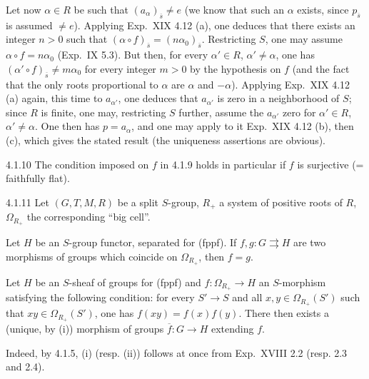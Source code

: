Let now $\alpha\in R$ be such that $(a_\alpha)_{\overline s}\ne e$ (we know that such an $\alpha$ exists, since $p_{\overline s}$ is assumed $\ne e$). Applying Exp.~XIX 4.12 (a), one deduces that there exists an integer $n>0$ such that $(\alpha\circ f)_{\overline s}=(n\alpha_0)_{\overline s}$. Restricting $S$, one may assume $\alpha\circ f=n\alpha_0$ (Exp.~IX 5.3). But then, for every $\alpha'\in R$, $\alpha'\ne\alpha$, one has $(\alpha'\circ f)_{\overline s}\ne m\alpha_0$ for every integer $m>0$ by the hypothesis on $f$ (and the fact that the only roots proportional to $\alpha$ are $\alpha$ and $-\alpha$). Applying Exp.~XIX 4.12 (a) again, this time to $a_{\alpha'}$, one deduces that $a_{\alpha'}$ is zero in a neighborhood of $S$; since $R$ is finite, one may, restricting $S$ further, assume the $a_{\alpha'}$ zero for $\alpha'\in R$, $\alpha'\ne\alpha$. One then has $p=a_\alpha$, and one may apply to it Exp.~XIX 4.12 (b), then (c), which gives the stated result (the uniqueness assertions are obvious).
\begin{remark}{4.1.10}\label{XXII.4.1.10}
The condition imposed on $f$ in 4.1.9 holds in particular if $f$ is surjective (= faithfully flat).
\end{remark}
\begin{proposition}{4.1.11}\label{XXII.4.1.11}
Let $(G,T,M,R)$ be a split $S$-group, $R_+$ a system of positive roots of $R$, $\Omega_{R_+}$ the corresponding ``big cell''.
\begin{enumeratei}
\item Let $H$ be an $S$-group functor, separated{\renewcommand{\thefootnote}{(17)}} for (fppf). If $f,g:G\rightrightarrows H$ are two morphisms of groups which coincide on $\Omega_{R_+}$, then $f=g$.
\item Let $H$ be an $S$-sheaf of groups for (fppf) and $f:\Omega_{R_+}\to H$ an $S$-morphism satisfying the following condition: for every $S'\to S$ and all $x,y\in\Omega_{R_+}(S')$ such that $xy\in\Omega_{R_+}(S')$, one has $f(xy)=f(x)f(y)$. There then exists a (unique, by (i)) morphism of groups $\overline f:G\to H$ extending $f$.
\end{enumeratei}
\end{proposition}
Indeed, by 4.1.5, (i) (resp. (ii)) follows at once from Exp.~XVIII 2.2 (resp. 2.3 and 2.4).
